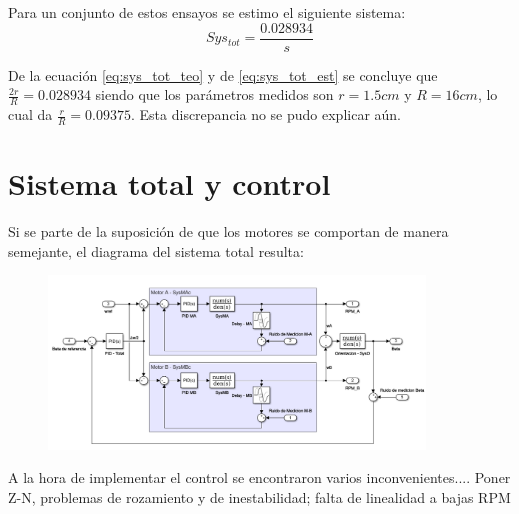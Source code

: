 \documentclass[10pt,conference,a4paper,onecolumn]{article}%
\begin{document}
Para un conjunto de estos ensayos se estimo el siguiente sistema:
\begin{equation}
Sys_{tot}= \frac{0.028934}{s}  
\label{eq:sys_tot_est}
\end{equation}

De la ecuación \ref{eq:sys_tot_teo} y de \ref{eq:sys_tot_est}  se concluye que $\frac{2r}{R}=0.028934 $ siendo que los parámetros medidos son $r=1.5cm$ y $R=16cm$, lo cual da $\frac{r}{R}=0.09375 $. Esta discrepancia no se pudo explicar aún.   

\section{Sistema total y control}

Si se parte de la suposición de que los motores se comportan de manera semejante, el diagrama del sistema total resulta:


\begin{figure}[h]
\centering
\includegraphics[width=10cm]{./imagenes/sistema_total}
\caption{}
\end{figure}


A la hora de implementar el control se encontraron varios inconvenientes.... Poner Z-N, problemas de rozamiento y de inestabilidad; falta de linealidad a bajas RPM
\end{document}
